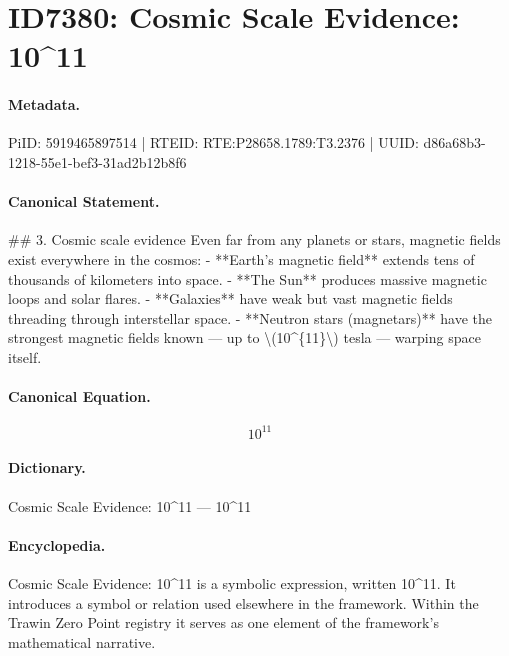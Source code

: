\section*{ID7380: Cosmic Scale Evidence: 10\textasciicircum{}11}
\paragraph{Metadata.}
PiID: 5919465897514 | RTEID: RTE:P28658.1789:T3.2376 | UUID: d86a68b3-1218-55e1-bef3-31ad2b12b8f6

\paragraph{Canonical Statement.}
\#\# 3. Cosmic scale evidence Even far from any planets or stars, magnetic fields exist everywhere in the cosmos: - **Earth’s magnetic field** extends tens of thousands of kilometers into space. - **The Sun** produces massive magnetic loops and solar flares. - **Galaxies** have weak but vast magnetic fields threading through interstellar space. - **Neutron stars (magnetars)** have the strongest magnetic fields known — up to \textbackslash{}(10\textasciicircum{}\{11\}\textbackslash{}) tesla — warping space itself.

\paragraph{Canonical Equation.}
\[
10^{11}
\]

\paragraph{Dictionary.}
Cosmic Scale Evidence: 10\textasciicircum{}11 — 10\textasciicircum{}11

\paragraph{Encyclopedia.}
Cosmic Scale Evidence: 10\textasciicircum{}11 is a symbolic expression, written 10\textasciicircum{}11. It introduces a symbol or relation used elsewhere in the framework. Within the Trawin Zero Point registry it serves as one element of the framework's mathematical narrative.
